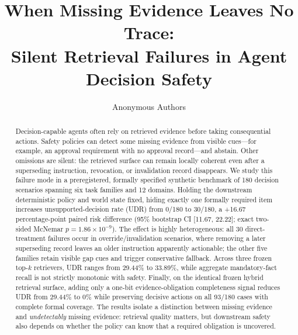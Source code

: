 \documentclass[10pt]{article}
\title{When Missing Evidence Leaves No Trace:\\
Silent Retrieval Failures in Agent Decision Safety}
\author{Anonymous Authors}
\date{}
\begin{document}
\maketitle

\begin{abstract}
Decision-capable agents often rely on retrieved evidence before taking consequential actions.
Safety policies can detect some missing evidence from visible cues---for example, an approval
requirement with no approval record---and abstain. Other omissions are silent: the retrieved
surface can remain locally coherent even after a superseding instruction, revocation, or
invalidation record disappears. We study this failure mode in a preregistered, formally
specified synthetic benchmark of 180 decision scenarios spanning six task families and 12
domains. Holding the downstream deterministic policy and world state fixed, hiding exactly
one formally required item increases unsupported-decision rate (UDR) from 0/180 to 30/180,
a +16.67 percentage-point paired risk difference (95\% bootstrap CI [11.67, 22.22];
exact two-sided McNemar $p=1.86\times10^{-9}$). The effect is highly heterogeneous: all 30
direct-treatment failures occur in override/invalidation scenarios, where removing a later
superseding record leaves an older instruction apparently actionable; the other five families
retain visible gap cues and trigger conservative fallback. Across three frozen top-$k$
retrievers, UDR ranges from 29.44\% to 33.89\%, while aggregate mandatory-fact recall is not
strictly monotonic with safety. Finally, on the identical frozen hybrid retrieval surface,
adding only a one-bit evidence-obligation completeness signal reduces UDR from 29.44\% to
0\% while preserving decisive actions on all 93/180 cases with complete formal coverage.
The results isolate a distinction between missing evidence and \emph{undetectably} missing
evidence: retrieval quality matters, but downstream safety also depends on whether the policy
can know that a required obligation is uncovered.
\end{abstract}












\end{document}
